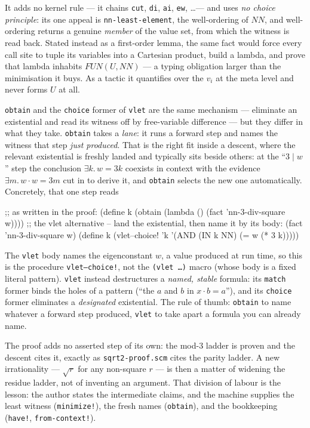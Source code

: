 \begin{remark}
It adds no kernel rule --- it chains \texttt{cut}, \texttt{di}, \texttt{ai},
\texttt{ew}, \ldots --- and uses \emph{no choice principle}: its one appeal is
\texttt{nn-least-element}, the well-ordering of $\mathit{NN}$, and well-ordering
returns a genuine \emph{member} of the value set, from which the witness is read
back.  Stated instead as a first-order lemma, the same fact would force every
call site to tuple its variables into a Cartesian product, build a lambda, and
prove that lambda inhabits $\mathit{FUN}(U,\mathit{NN})$ --- a typing obligation
larger than the minimisation it buys.  As a tactic it quantifies over the $v_i$
at the meta level and never forms $U$ at all.
\end{remark}

\begin{remark}
\texttt{obtain} and the \texttt{choice} former of \texttt{vlet} are the same
mechanism --- eliminate an existential and read its witness off by
free-variable difference --- but they differ in what they take.  \texttt{obtain}
takes a \emph{lane}: it runs a forward step and names the witness that step
\emph{just produced}.  That is the right fit inside a descent, where the relevant
existential is freshly landed and typically sits beside others: at the
``$3 \mid w$'' step the conclusion $\exists k.\,w = 3k$ coexists in context with
the evidence $\exists m.\,w\cdot w = 3m$ cut in to derive it, and \texttt{obtain}
selects the new one automatically.  Concretely, that one step reads
\begin{VNBsnip}
;; as written in the proof:
(define k (obtain (lambda () (fact 'nn-3-div-square w))))
;; the vlet alternative -- land the existential, then name it by its body:
(fact 'nn-3-div-square w)
(define k (vlet--choice! 'k '(AND (IN k NN) (= w (* 3 k)))))
\end{VNBsnip}
The \texttt{vlet} body names the eigenconstant $w$, a value produced at run
time, so this is the procedure \texttt{vlet--choice!}, not the
\texttt{(vlet \ldots)} macro (whose body is a fixed literal pattern).
\texttt{vlet} instead destructures a
\emph{named, stable} formula: its \texttt{match} former binds the holes of a
pattern (``the $a$ and $b$ in $x\cdot b = a$''), and its \texttt{choice} former
eliminates a \emph{designated} existential.  The rule of thumb: \texttt{obtain}
to name whatever a forward step produced, \texttt{vlet} to take apart a formula
you can already name.
\end{remark}

\begin{remark}
The proof adds no asserted step of its own: the mod-$3$ ladder is proven and the
descent cites it, exactly as \texttt{sqrt2-proof.scm} cites the parity ladder.
A new irrationality --- $\sqrt r$ for any non-square $r$ --- is then a matter of
widening the residue ladder, not of inventing an argument.  That division of
labour is the lesson: the author states the intermediate claims, and the machine
supplies the least witness (\texttt{minimize!}), the fresh names
(\texttt{obtain}), and the bookkeeping (\texttt{have!}, \texttt{from-context!}).
\end{remark}

